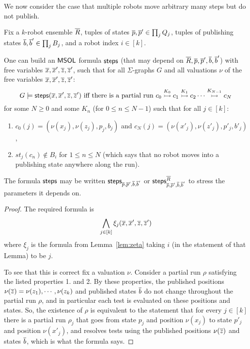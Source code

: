  

We now consider the case that multiple robots move arbitrary many steps but do not publish.


\begin{lemma} \label{lem:steps}
Fix a $k$-robot ensemble $\tup{R}$, tuples of states $\tup{p},\tup{p}' \in \prod_j Q_j$, tuples of publishing states 
$\tup{b},\tup{b}' \in \prod_j B_j$, and a robot index $i \in [k]$.

One can build an $\msol$ formula $\steps$ (that may depend on $\tup{R},\tup{p},\tup{p}',\tup{b},\tup{b}'$) with free variables 
$\tup{x}, \tup{x}', \tup{z}, \tup{z}'$, such that 
for all $\Sigma$-graphs $G$ and all valuations $\nu$ of the free variables $\tup{x}, \tup{x}', \tup{z},\tup{z}'$:
\[ 
 G \models \steps(\tup{x}, \tup{x}', \tup{z},\tup{z}') \mbox{ iff there is a partial run } 
 \onestep{c_0}{c_1}{K_0}\onestep{}{c_2}{K_1} \cdots \onestep{}{c_N}{K_{N-1}}
\]
for some $N \geq 0$ and some $K_n$ (for $0 \leq n \leq N-1$) such that for all $j \in [k]$:
 \begin{enumerate}
 \item $c_0(j) = 	(\nu(x_j),	\nu(z_j),		p_j,		b_j)$ and $c_N(j) =	(\nu(x'_j),	\nu(z'_j),	p'_j,	b'_j)$,
 \item $st_j(c_n) \not \in B_i$ for $1 \leq n \leq N$ (which says that no robot moves into a publishing state anywhere along the run).
 \end{enumerate}
% 
The formula $\steps$ may be written $\steps_{\tup{p},\tup{p}',\tup{b},\tup{b}'}$ or $\steps^{\tup{R}}_{\tup{p},\tup{p}',\tup{b},\tup{b}'}$ to stress the parameters it depends on.
\end{lemma}

\begin{proof}
The required formula is 
\[
 \bigwedge_{j \in [k]} \xi_j(\tup{x}, \tup{x}', \tup{z},\tup {z}') 
\]
where $\xi_j$ is the formula from Lemma~\ref{lem:zeta} taking $i$ (in the statement of that Lemma) to be $j$. 

To see that this is correct fix a valuation $\nu$. Consider a partial run $\rho$ satisfying the listed properties 1. and 2.
By these properties, the published positions $\nu(\tup{z}) = \nu(z_1), \cdots, \nu(z_k)$ and published states $\tup{b}$ do not change throughout the partial run $\rho$, and in particular each test is evaluated on these positions and states. So, the existence of $\rho$ is equivalent to the statement that for every $j \in [k]$ there is a partial run $\rho_j$ that goes from state 
$p_j$ and position $\nu(x_j)$ to state $p'_j$ and position $\nu(x'_j)$, and resolves tests using the published positions $\nu(\tup{z})$ and states $\tup{b}$, which is what the formula says.
\end{proof}

